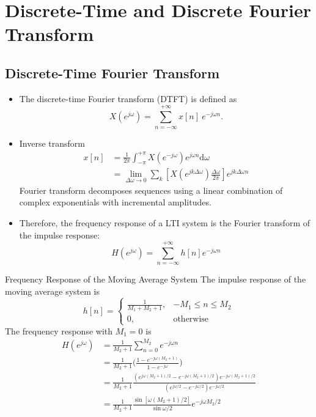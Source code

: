 \section{Discrete-Time and Discrete Fourier Transform}
\subsection{Discrete-Time Fourier Transform}
\begin{itemize}
    \item The discrete-time Fourier transform (DTFT) is defined as
    \[
        X(e^{j\omega}) = \sum_{n=-\infty}^{+\infty} x[n] \ e^{-j\omega n}.
    \]
        

    \item Inverse transform
    \begin{align*}
        x[n]
        &= \frac{1}{2\pi} \int_{-\pi}^{+\pi} X(e^{-j\omega}) e^{j\omega n} \mathrm{d}\omega \\
        &= \lim_{\Delta \omega \to 0} \sum_{k} [X(e^{jk\Delta \omega})\frac{\Delta \omega}{2\pi}]e^{jk\Delta \omega n}
    \end{align*}
    Fourier transform decomposes sequences using a linear combination of complex exponentials with incremental amplitudes.

    \item Therefore, the frequency response of a LTI system is the Fourier transform of the impulse response:
    \[
        H(e^{j\omega}) = \sum_{n=-\infty}^{+\infty} h[n] e^{-j\omega n}
    \]
\end{itemize}

\begin{ex}{Frequency Response of the Moving Average System}
The impulse response of the moving average system is
\[
    h[n] = 
    \begin{cases}
        \frac{1}{M_1+M_2+1},    & -M_1 \leq n \leq M_2 \\
        0,  & \text{otherwise}
    \end{cases} 
\]
The frequency response with $M_1=0$ is
\begin{align*}
    H(e^{j\omega}) 
    & = \frac{1}{M_2+1} \sum_{n=0}^{M_2}e^{-j\omega n} \\
    & = \frac{1}{M_2+1} \bigg( \frac{1-e^{-j\omega (M_{2}+1)}}{1-e^{-j\omega}} \bigg) \\
    & = \frac{1}{M_2+1} \frac{(e^{j\omega(M_{2}+1)/2} - e^{-j\omega(M_{2}+1)/2})e^{-j\omega(M_{2}+1)/2}}{(e^{j\omega/2}-e^{-j\omega/2})e^{-j\omega/2}} \\
    & = \frac{1}{M_2+1} \frac{\sin[\omega(M_{2}+1)/2]}{\sin \omega/2}e^{-j\omega M_{2}/2}
\end{align*}
\end{ex}

